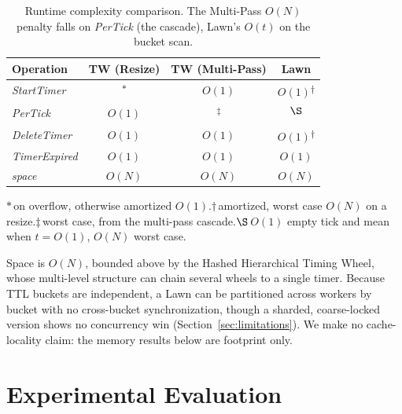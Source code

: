 \documentclass[conference]{IEEEtran}
\begin{document}
\begin{table}[ht]
	\begin{center}
		\begin{tabular}{l|c|c|c}
			\textbf{Operation} & \textbf{TW (Resize)} & \textbf{TW (Multi-Pass)} & \textbf{Lawn} \\
			\hline
			\textit{StartTimer} & \boldmath{$O(N)$}\textsuperscript{$\ast$} & $O(1)$ & $O(1)$\textsuperscript{$\dagger$} \\
			\textit{PerTick} & $O(1)$ & \boldmath{$O(N)$}\textsuperscript{$\ddagger$} & \boldmath{$O(t)$}\textsuperscript{$\S$} \\
			\textit{DeleteTimer} & $O(1)$ & $O(1)$ & $O(1)$\textsuperscript{$\dagger$} \\
			\textit{TimerExpired} & $O(1)$ & $O(1)$ & $O(1)$ \\
			\textit{space} & $O(N)$ & $O(N)$ & $O(N)$ \\
		\end{tabular}
		\linebreak
		{\footnotesize\raggedright $\ast$\,on overflow, otherwise amortized $O(1)$.\quad $\dagger$\,amortized, worst case $O(N)$ on a resize.\quad $\ddagger$\,worst case, from the multi-pass cascade.\quad $\S$\,$O(1)$ empty tick and mean when $t=O(1)$, $O(N)$ worst case.\par}
			\caption{Runtime complexity comparison. The Multi-Pass $O(N)$ penalty falls on \textit{PerTick} (the cascade), Lawn's $O(t)$ on the bucket scan.\label{tab:compare}}
	\end{center}
\end{table}

Space is $O(N)$, bounded above by the Hashed Hierarchical Timing Wheel, whose multi-level structure can chain several wheels to a single timer. Because TTL buckets are independent, a Lawn can be partitioned across workers by bucket with no cross-bucket synchronization, though a sharded, coarse-locked version shows no concurrency win (Section~\ref{sec:limitations}). We make no cache-locality claim: the memory results below are footprint only.

\section{Experimental Evaluation}
\label{sec:eval}
\end{document}
